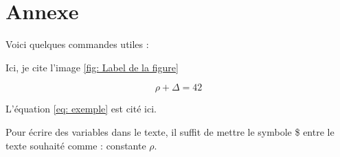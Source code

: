 \documentclass{rapportDUETI}
\begin{document}
\section{Annexe}




Voici quelques commandes utiles :


Ici, je cite l'image \ref{fig: Label de la figure}



\begin{equation} \label{eq: exemple}
\rho + \Delta = 42
\end{equation}

L'équation \ref{eq: exemple} est cité ici. 


Pour écrire des variables dans le texte, il suffit de mettre le symbole \$ entre le texte souhaité comme : constante $\rho$. 
\end{document}
